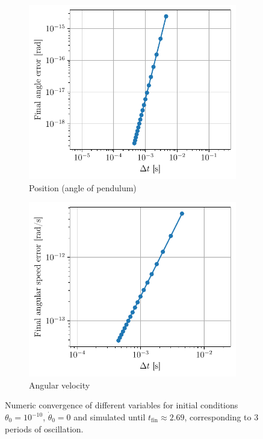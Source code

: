 \begin{figure}[h]
    \centering
    \begin{subfigure}{0.48\linewidth}
        \centering
        \includegraphics[width=\linewidth]{figures/no_excitation_pos_conv.pdf}
        \caption{Position (angle of pendulum)}
    \end{subfigure}
    \begin{subfigure}{0.48\linewidth}
        \centering
        \includegraphics[width=\linewidth]{figures/no_excitation_vel_conv.pdf}
        \caption{Angular velocity}
    \end{subfigure}
    \caption{Numeric convergence of different variables for initial conditions \(\theta_0=10^{-10}\), \(\dot\theta_0=0\) and simulated until \(t_\textrm{fin} \approx 2.69\), corresponding to 3 periods of oscillation.}
    \label{fig:numeric_convergence_small_angle}
\end{figure}

